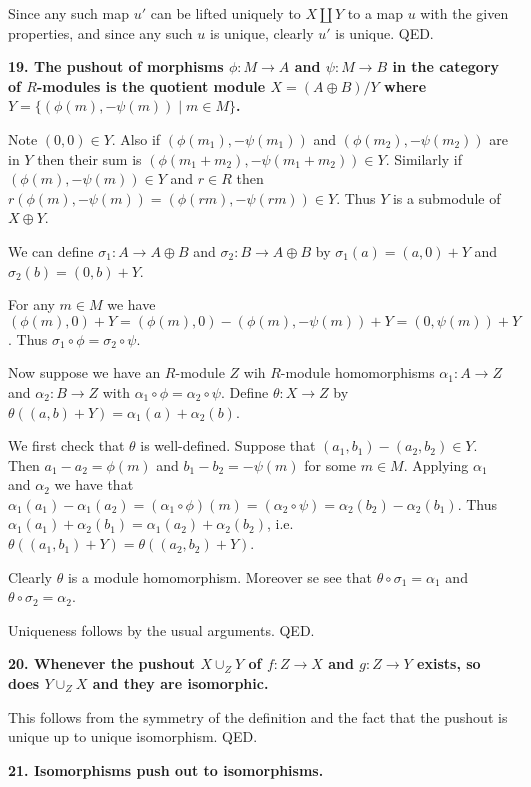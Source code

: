 \documentclass[12pt]{article}
\begin{document}
Since any such map $u'$ can be lifted uniquely to $X\coprod Y$ to a map $u$ with the given properties, and since any such $u$ is unique, clearly $u'$ is unique. QED.

\textbf{19. The pushout of morphisms $\phi : M \to A$ and $\psi : M \to B$ in the category of $R$-modules is the quotient module $X = (A\oplus B)/Y$ where $Y = \{(\phi(m), - \psi(m)) \;|\; m \in M\}$.}

Note $(0, 0) \in Y$. Also if $(\phi(m_1), -\psi(m_1))$ and $(\phi(m_2), -\psi(m_2))$ are in $Y$ then their sum is $(\phi(m_1 + m_2), -\psi(m_1 + m_2)) \in Y$. Similarly if $(\phi(m), -\psi(m)) \in Y$ and $r \in R$ then $r(\phi(m), -\psi(m)) = (\phi(rm), -\psi(rm)) \in Y$. Thus $Y$ is a submodule of $X\oplus Y$.

We can define $\sigma_1 : A \to A\oplus B$ and $\sigma_2 : B \to A\oplus B$ by $\sigma_1(a) = (a, 0) + Y$ and $\sigma_2(b) = (0, b) + Y$. 

For any $m \in M$ we have $(\phi(m), 0) + Y = (\phi(m), 0) - (\phi(m), -\psi(m)) + Y = (0, \psi(m)) + Y$. Thus $\sigma_1\circ \phi = \sigma_2\circ \psi$. 

Now suppose we have an $R$-module $Z$ wih $R$-module homomorphisms $\alpha_1 : A \to Z$ and $\alpha_2 : B \to Z$ with $\alpha_1\circ \phi = \alpha_2\circ \psi$. Define $\theta : X \to Z$ by $\theta((a, b) + Y) = \alpha_1(a) + \alpha_2(b)$.

We first check that $\theta$ is well-defined. Suppose that $(a_1, b_1) - (a_2, b_2) \in Y$. Then $a_1 - a_2 = \phi(m)$ and $b_1 - b_2 = -\psi(m)$ for some $m \in M$. Applying $\alpha_1$ and $\alpha_2$ we have that $\alpha_1(a_1) - \alpha_1(a_2) = (\alpha_1\circ \phi)(m) = (\alpha_2\circ \psi) = \alpha_2(b_2) - \alpha_2(b_1)$. Thus $\alpha_1(a_1) + \alpha_2(b_1) = \alpha_1(a_2) + \alpha_2(b_2)$, i.e. $\theta((a_1, b_1) + Y) = \theta((a_2, b_2) + Y)$.

Clearly $\theta$ is a module homomorphism. Moreover se see that $\theta\circ \sigma_1 = \alpha_1$ and $\theta\circ \sigma_2 = \alpha_2$.

Uniqueness follows by the usual arguments. QED.

\textbf{20. Whenever the pushout $X\cup_Z Y$ of $f : Z \to X$ and $g : Z \to Y$ exists, so does $Y\cup_Z X$ and they are isomorphic.}

This follows from the symmetry of the definition and the fact that the pushout is unique up to unique isomorphism. QED.

\textbf{21. Isomorphisms push out to isomorphisms.}
\end{document}
